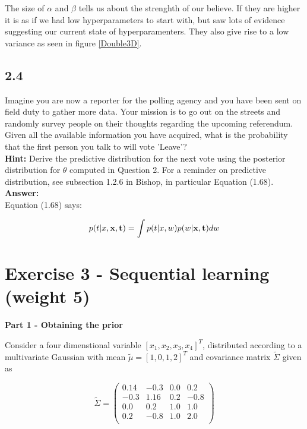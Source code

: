 \documentclass[a4paper]{article}
\begin{document}
The size of $\alpha$ and $\beta$ tells us about the strenghth of our believe. If they are higher it is as if we had low hyperparameters to start with, but saw lots of evidence suggesting our current state of hyperparamenters. They also give rise to a low variance as seen in figure \ref{Double3D}.




\subsection*{2.4}

Imagine you are now a reporter for the polling agency and you have been sent on field duty to gather more data. Your mission is to go out on the streets and randomly survey people on their thoughts regarding the upcoming referendum. Given all the available information you have acquired, what is the probability that the first person you talk to will vote 'Leave'?\\

\textbf{Hint:} Derive the predictive distribution for the next vote using the posterior distribution for $\theta$ computed in Question 2. For a reminder on predictive distribution, see subsection 1.2.6 in Bishop, in particular Equation (1.68).\\


\textbf{Answer:}\\


Equation (1.68) says:

\begin{equation}
p(t|x,\bold x,\bold t) = \int p(t|x,w)p(w|\bold x,\bold t) dw
\end{equation}





\section*{Exercise 3 - Sequential learning (weight 5)}


\textbf{Part 1 - Obtaining the prior}

Consider a four dimenstional variable $[x_1, x_2, x_3, x_4]^T$, distributed according to a multivariate Gaussian with mean $\tilde{\mu} = [1,0,1,2]^T$ and covariance matrix $\tilde{\Sigma}$ given as

	
\[ \tilde{\Sigma} = 
	\left(
	\begin{array}{cc|cc}
	0.14 & -0.3 & 0.0 & 0.2 \\
	-0.3 & 1.16 & 0.2 & -0.8 \\
	\hline
	0.0 & 0.2 & 1.0 & 1.0 \\
	0.2 & -0.8 & 1.0 & 2.0 \\	
	\end{array}
	\right)
\]	
\end{document}
